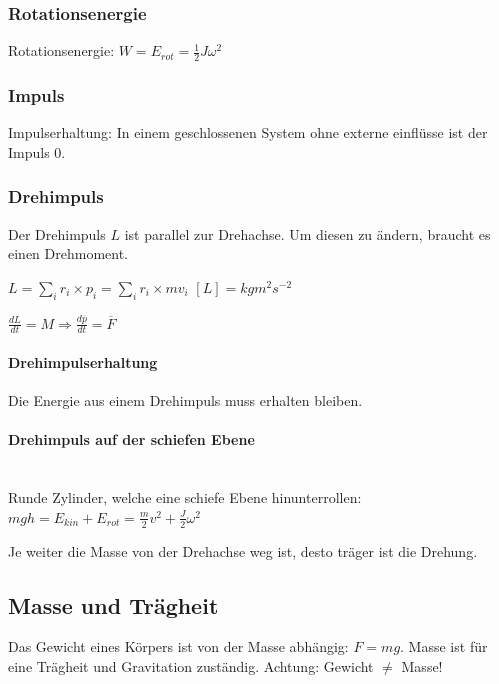 \documentclass[a4paper]{scrartcl}
\begin{document}
\subsubsection{Rotationsenergie}

	Rotationsenergie: $W = E_{rot} = \frac{1}{2} J \omega^2$
	
\subsubsection{Impuls}

Impulserhaltung: In einem geschlossenen System ohne externe einflüsse ist der Impuls 0. 
	
\subsubsection{Drehimpuls} %
	Der Drehimpuls $L$ ist parallel zur Drehachse. Um diesen zu ändern, braucht es einen Drehmoment.

	$L = \sum_i{r_i \times p_i} = \sum_i{r_i \times mv_i}$
	$\left[ L \right] = kg m^2 s^{-2}$
	
	$\frac{dL}{dt} = M \Rightarrow \frac{d\overline{p}}{dt} = \overline{F}$
	


	\paragraph{Drehimpulserhaltung}
	
	Die Energie aus einem Drehimpuls muss erhalten bleiben.
	
	
	\paragraph{Drehimpuls auf der schiefen Ebene} \hfill \\
	
	Runde Zylinder, welche eine schiefe Ebene hinunterrollen: $mgh = E_{kin} + E_{rot} =\frac{m}{2} v^2 + \frac{J}{2} \omega^2$
	
	Je weiter die Masse von der Drehachse weg ist, desto träger ist die Drehung.
	

\subsection{Masse und Trägheit}
	Das Gewicht eines Körpers ist von der Masse abhängig: $F = mg$.
	Masse ist für eine Trägheit und Gravitation zuständig. Achtung: Gewicht $\neq$ Masse!
\end{document}
